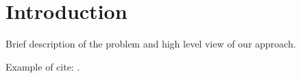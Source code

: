 \section{Introduction}
Brief description of the problem and high level view of our approach. 

Example of cite: \cite{Hainan17}.